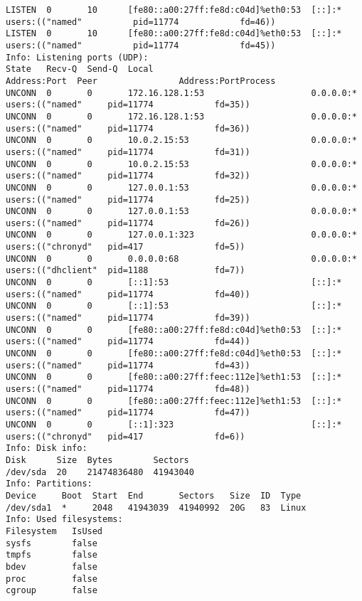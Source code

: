 \begin{longlisting}
\begin{verbatim}
LISTEN  0       10      [fe80::a00:27ff:fe8d:c04d]%eth0:53  [::]:*        users:(("named"          pid=11774            fd=46))
LISTEN  0       10      [fe80::a00:27ff:fe8d:c04d]%eth0:53  [::]:*        users:(("named"          pid=11774            fd=45))
Info: Listening ports (UDP):
State   Recv-Q  Send-Q  Local                               Address:Port  Peer                Address:PortProcess
UNCONN  0       0       172.16.128.1:53                     0.0.0.0:*     users:(("named"     pid=11774            fd=35))
UNCONN  0       0       172.16.128.1:53                     0.0.0.0:*     users:(("named"     pid=11774            fd=36))
UNCONN  0       0       10.0.2.15:53                        0.0.0.0:*     users:(("named"     pid=11774            fd=31))
UNCONN  0       0       10.0.2.15:53                        0.0.0.0:*     users:(("named"     pid=11774            fd=32))
UNCONN  0       0       127.0.0.1:53                        0.0.0.0:*     users:(("named"     pid=11774            fd=25))
UNCONN  0       0       127.0.0.1:53                        0.0.0.0:*     users:(("named"     pid=11774            fd=26))
UNCONN  0       0       127.0.0.1:323                       0.0.0.0:*     users:(("chronyd"   pid=417              fd=5))
UNCONN  0       0       0.0.0.0:68                          0.0.0.0:*     users:(("dhclient"  pid=1188             fd=7))
UNCONN  0       0       [::1]:53                            [::]:*        users:(("named"     pid=11774            fd=40))
UNCONN  0       0       [::1]:53                            [::]:*        users:(("named"     pid=11774            fd=39))
UNCONN  0       0       [fe80::a00:27ff:fe8d:c04d]%eth0:53  [::]:*        users:(("named"     pid=11774            fd=44))
UNCONN  0       0       [fe80::a00:27ff:fe8d:c04d]%eth0:53  [::]:*        users:(("named"     pid=11774            fd=43))
UNCONN  0       0       [fe80::a00:27ff:feec:112e]%eth1:53  [::]:*        users:(("named"     pid=11774            fd=48))
UNCONN  0       0       [fe80::a00:27ff:feec:112e]%eth1:53  [::]:*        users:(("named"     pid=11774            fd=47))
UNCONN  0       0       [::1]:323                           [::]:*        users:(("chronyd"   pid=417              fd=6))
Info: Disk info:
Disk      Size  Bytes        Sectors
/dev/sda  20    21474836480  41943040
Info: Partitions:
Device     Boot  Start  End       Sectors   Size  ID  Type
/dev/sda1  *     2048   41943039  41940992  20G   83  Linux
Info: Used filesystems:
Filesystem   IsUsed
sysfs        false
tmpfs        false
bdev         false
proc         false
cgroup       false

\end{verbatim}
\end{longlisting}
